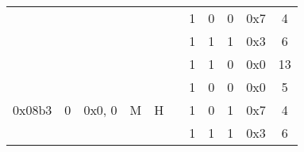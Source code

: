 \documentclass[11pt]{homework}
\newcommand{\xmark}{\ding{55}}%
\begin{document}
\begin{arabicparts}
{\begin{tabular}{|c|c|c|c|c|c|c|c|c|c|c|}
            \cline{7-11}
                                     &                                                                        &                             &                                                                   &                                                                    &                                                                      & 1                        & 0     & 0         & 0x7 & 4             \\
            \cline{7-11}
                                     &                                                                        &                             &                                                                   &                                                                    &                                                                      & 1                        & 1     & 1         & 0x3 & 6             \\
            \cline{7-11}
                                     &                                                                        &                             &                                                                   &                                                                    &                                                                      & 1                        & 1     & 0         & 0x0 & 13            \\
            \hline
            \multirow{4}{*}{0x08b3}  & \multirow{4}{*}{0}                                                     & \multirow{4}{*}{0x0, 0}     & \multirow{4}{*}{M}                                                & \multirow{4}{*}{H}                                                 & \multirow{4}{*}{\xmark}                                              & 1                        & 0     & 0         & 0x0 & 5             \\
            \cline{7-11}
                                     &                                                                        &                             &                                                                   &                                                                    &                                                                      & 1                        & 0     & 1         & 0x7 & 4             \\
            \cline{7-11}
                                     &                                                                        &                             &                                                                   &                                                                    &                                                                      & 1                        & 1     & 1         & 0x3 & 6             \\

\end{tabular}}
\end{arabicparts}
\end{document}
